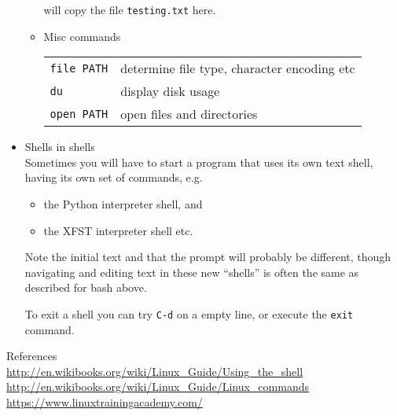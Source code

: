 \documentclass[a4,landscape]{seminar}
\begin{document}
\begin{slide}
\begin{itemize}
\begin{itemize}
      will copy the file \texttt{testing.txt} here.
    \item Misc commands\\[1ex]
      \begin{tabular}{|l|l|}
        \hline
        \texttt{file PATH} & determine file type, character encoding etc\\
        \texttt{du}   & display disk usage\\
        \texttt{open PATH} & open files and directories\\\hline
      \end{tabular}
    \end{itemize}
    \clearpage{}
  \item Shells in shells\\[1ex]
    Sometimes you will have to start a program that uses its own text
    shell, having its own set of commands, e.g.
    \begin{itemize}
    \item the Python interpreter shell, and
    \item the XFST interpreter shell etc.
    \end{itemize}
    Note the initial text and that the prompt will probably be
    different, though navigating and editing text in these new
    ``shells'' is often the same as described for bash above.

    To exit a shell you can try \texttt{C-d} on a empty line, or
    execute the \texttt{exit} command.
  \end{itemize}
\end{slide}
\begin{slide}
  {\Large References}\\[1ex]
  \url{http://en.wikibooks.org/wiki/Linux_Guide/Using_the_shell}
  \url{http://en.wikibooks.org/wiki/Linux_Guide/Linux_commands}
  \url{https://www.linuxtrainingacademy.com/}
\end{slide}
\end{document}
